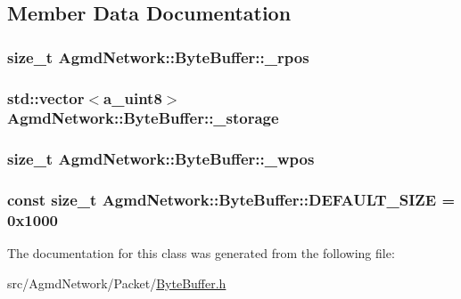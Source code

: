 \subsection{Member Data Documentation}
\hypertarget{class_agmd_network_1_1_byte_buffer_af3874e3f81641a76da487879b5d861a9}{
\subsubsection[{\+\_\+rpos}]{\setlength{\rightskip}{0pt plus 5cm}size\+\_\+t Agmd\+Network\+::\+Byte\+Buffer\+::\+\_\+rpos\hspace{0.3cm}{\ttfamily [protected]}}}\label{class_agmd_network_1_1_byte_buffer_af3874e3f81641a76da487879b5d861a9}
\hypertarget{class_agmd_network_1_1_byte_buffer_a72541e039bd7f1b0573b2a1af04e4d4c}{
\subsubsection[{\+\_\+storage}]{\setlength{\rightskip}{0pt plus 5cm}std\+::vector$<${\bf a\+\_\+uint8}$>$ Agmd\+Network\+::\+Byte\+Buffer\+::\+\_\+storage\hspace{0.3cm}{\ttfamily [protected]}}}\label{class_agmd_network_1_1_byte_buffer_a72541e039bd7f1b0573b2a1af04e4d4c}
\hypertarget{class_agmd_network_1_1_byte_buffer_ad5b87e7a5fe12a9e0499c65082b21208}{
\subsubsection[{\+\_\+wpos}]{\setlength{\rightskip}{0pt plus 5cm}size\+\_\+t Agmd\+Network\+::\+Byte\+Buffer\+::\+\_\+wpos\hspace{0.3cm}{\ttfamily [protected]}}}\label{class_agmd_network_1_1_byte_buffer_ad5b87e7a5fe12a9e0499c65082b21208}
\hypertarget{class_agmd_network_1_1_byte_buffer_a152263f475290fe24839a64ef4d2b0d4}{
\subsubsection[{D\+E\+F\+A\+U\+L\+T\+\_\+\+S\+I\+Z\+E}]{\setlength{\rightskip}{0pt plus 5cm}const size\+\_\+t Agmd\+Network\+::\+Byte\+Buffer\+::\+D\+E\+F\+A\+U\+L\+T\+\_\+\+S\+I\+Z\+E = 0x1000\hspace{0.3cm}{\ttfamily [static]}}}\label{class_agmd_network_1_1_byte_buffer_a152263f475290fe24839a64ef4d2b0d4}


The documentation for this class was generated from the following file\+:\begin{DoxyCompactItemize}
\item 
src/\+Agmd\+Network/\+Packet/\hyperlink{_byte_buffer_8h}{Byte\+Buffer.\+h}\end{DoxyCompactItemize}
